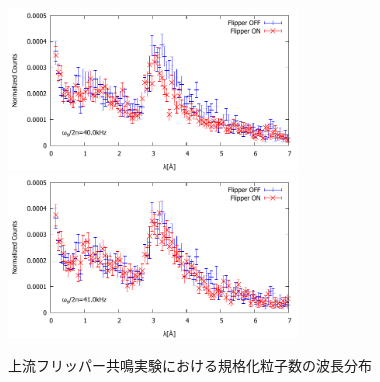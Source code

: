 \begin{figure}[h]
\includegraphics[height=4.3cm]{resonance/analysis/Flipper1_NormalizedCounts_400kHz.pdf}\\
\includegraphics[height=4.3cm]{resonance/analysis/Flipper1_NormalizedCounts_410kHz.pdf}
\caption{上流フリッパー共鳴実験における規格化粒子数の波長分布}\label{Resonance_fig_Flipper1_NormalizedCounts}
\end{figure}

